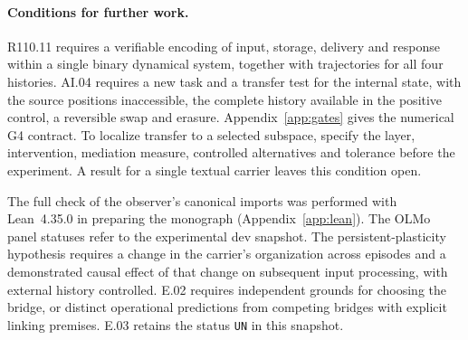 \paragraph{Conditions for further work.}
R110.11 requires a verifiable encoding of input, storage, delivery and response within a single binary dynamical system, together with trajectories for all four histories. AI.04 requires a new task and a transfer test for the internal state, with the source positions inaccessible, the complete history available in the positive control, a reversible swap and erasure. Appendix~\ref{app:gates} gives the numerical G4 contract. To localize transfer to a selected subspace, specify the layer, intervention, mediation measure, controlled alternatives and tolerance before the experiment. A result for a single textual carrier leaves this condition open.

The full check of the observer's canonical imports was performed with Lean~4.35.0 in preparing the monograph (Appendix~\ref{app:lean}). The OLMo panel statuses refer to the experimental dev snapshot. The persistent-plasticity hypothesis requires a change in the carrier's organization across episodes and a demonstrated causal effect of that change on subsequent input processing, with external history controlled. E.02 requires independent grounds for choosing the bridge, or distinct operational predictions from competing bridges with explicit linking premises. E.03 retains the status \texttt{UN} in this snapshot.
